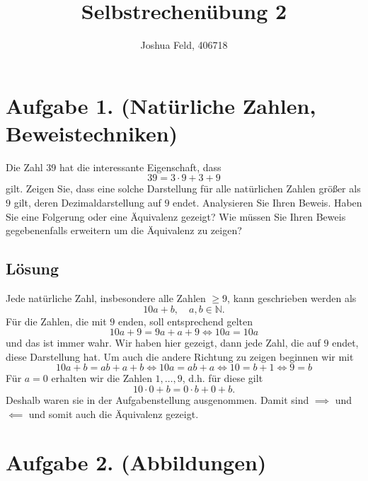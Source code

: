 \documentclass[german,12pt]{homework}
\title{Selbstrechenübung 2}
\author{Joshua Feld, 406718}
\institute{RWTH Aachen University\\Center for Computational Engineering Science}
\newcommand{\NN}{\mathbb{N}}
\begin{document}
    \maketitle

    \section*{Aufgabe 1. (Natürliche Zahlen, Beweistechniken)}

    \begin{problem}
        Die Zahl \(39\) hat die interessante Eigenschaft, dass
        \[39 = 3 \cdot 9 + 3 + 9\]
        gilt. Zeigen Sie, dass eine solche Darstellung für alle natürlichen
        Zahlen größer als \(9\) gilt, deren Dezimaldarstellung auf \(9\) endet.
        Analysieren Sie Ihren Beweis. Haben Sie eine Folgerung oder eine
        Äquivalenz gezeigt? Wie müssen Sie Ihren Beweis gegebenenfalls
        erweitern um die Äquivalenz zu zeigen?
    \end{problem}

    \subsection*{Lösung} Jede natürliche Zahl, insbesondere alle Zahlen \(\ge
    9\), kann geschrieben werden als
    \[10a + b, \quad a, b \in \NN.\]
    Für die Zahlen, die mit \(9\) enden, soll entsprechend gelten
    \[10a + 9 = 9a + a + 9 \iff 10a = 10a\]
    und das ist immer wahr.  Wir haben hier gezeigt, dann jede Zahl, die auf
    \(9\) endet, diese Darstellung hat. Um auch die andere Richtung zu zeigen
    beginnen wir mit
    \[10a + b = ab + a + b \iff 10a = ab + a \iff 10 = b + 1 \iff 9 = b\]
    Für \(a = 0\) erhalten wir die Zahlen \(1, \ldots, 9\), d.h. für diese gilt
    \[10 \cdot 0 + b = 0 \cdot b + 0 + b.\]
    Deshalb waren sie in der Aufgabenstellung ausgenommen. Damit sind
    \(\implies\) und \(\impliedby\) und somit auch die Äquivalenz gezeigt.

    \section*{Aufgabe 2. (Abbildungen)}
\end{document}

